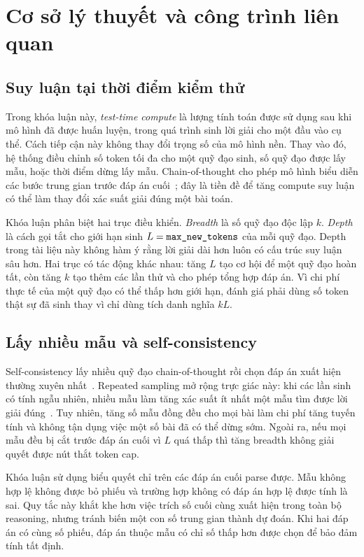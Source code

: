 \chapter{Cơ sở lý thuyết và công trình liên quan}
\label{chap:related-work}

\section{Suy luận tại thời điểm kiểm thử}

Trong khóa luận này, \emph{test-time compute} là lượng tính toán được sử dụng sau khi
mô hình đã được huấn luyện, trong quá trình sinh lời giải cho một đầu vào cụ thể. Cách
tiếp cận này không thay đổi trọng số của mô hình nền. Thay vào đó, hệ thống điều chỉnh
số token tối đa cho một quỹ đạo sinh, số quỹ đạo được lấy mẫu, hoặc thời điểm dừng lấy
mẫu. Chain-of-thought cho phép mô hình biểu diễn các bước trung gian trước đáp án
cuối~\cite{wei2022cot}; đây là tiền đề để tăng compute suy luận có thể làm thay đổi xác
suất giải đúng một bài toán.

Khóa luận phân biệt hai trục điều khiển. \emph{Breadth} là số quỹ đạo độc lập $k$.
\emph{Depth} là cách gọi tắt cho giới hạn sinh $L=\texttt{max\_new\_tokens}$ của mỗi
quỹ đạo. Depth trong tài liệu này không hàm ý rằng lời giải dài hơn luôn có cấu trúc
suy luận sâu hơn. Hai trục có tác động khác nhau: tăng $L$ tạo cơ hội để một quỹ đạo
hoàn tất, còn tăng $k$ tạo thêm các lần thử và cho phép tổng hợp đáp án. Vì chi phí
thực tế của một quỹ đạo có thể thấp hơn giới hạn, đánh giá phải dùng số token thật sự
đã sinh thay vì chỉ dùng tích danh nghĩa $kL$.

\section{Lấy nhiều mẫu và self-consistency}

Self-consistency lấy nhiều quỹ đạo chain-of-thought rồi chọn đáp án xuất hiện thường
xuyên nhất~\cite{wang2023selfconsistency}. Repeated sampling mở rộng trực giác này:
khi các lần sinh có tính ngẫu nhiên, nhiều mẫu làm tăng xác suất ít nhất một mẫu tìm
được lời giải đúng~\cite{brown2024monkeys}. Tuy nhiên, tăng số mẫu đồng đều cho mọi
bài làm chi phí tăng tuyến tính và không tận dụng việc một số bài đã có thể dừng sớm.
Ngoài ra, nếu mọi mẫu đều bị cắt trước đáp án cuối vì $L$ quá thấp thì tăng breadth
không giải quyết được nút thắt token cap.

Khóa luận sử dụng biểu quyết chỉ trên các đáp án cuối parse được. Mẫu không hợp lệ
không được bỏ phiếu và trường hợp không có đáp án hợp lệ được tính là sai. Quy tắc này
khắt khe hơn việc trích số cuối cùng xuất hiện trong toàn bộ reasoning, nhưng tránh biến
một con số trung gian thành dự đoán. Khi hai đáp án có cùng số phiếu, đáp án thuộc mẫu
có chỉ số thấp hơn được chọn để bảo đảm tính tất định.

